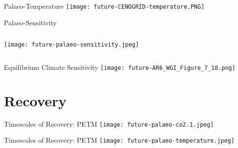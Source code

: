 \documentclass[aspectratio=169]{beamer}
\begin{document}
\begin{frame}{Palaeo-Temperature}
    \centering
    \texttt{[image: future-CENOGRID-temperature.PNG]}
\end{frame}

\begin{frame}{Palaeo-Sensitivity}
    \begin{columns}
        \begin{column}{0.5\linewidth}
            \texttt{[image: future-palaeo-sensitivity.jpeg]}
        \end{column}
    \end{columns}
\end{frame}

\begin{frame}{Equilibrium Climate Sensitivity}
    \centering
    \texttt{[image: future-AR6\_WGI\_Figure\_7\_18.png]}

\end{frame}

\section{Recovery}

\begin{frame}{Timescales of Recovery: PETM}
    \centering
    \texttt{[image: future-palaeo-co2.1.jpeg]}
\end{frame}

\begin{frame}{Timescales of Recovery: PETM}
    \centering
    \texttt{[image: future-palaeo-temperature.jpeg]}
\end{frame}
\end{document}
